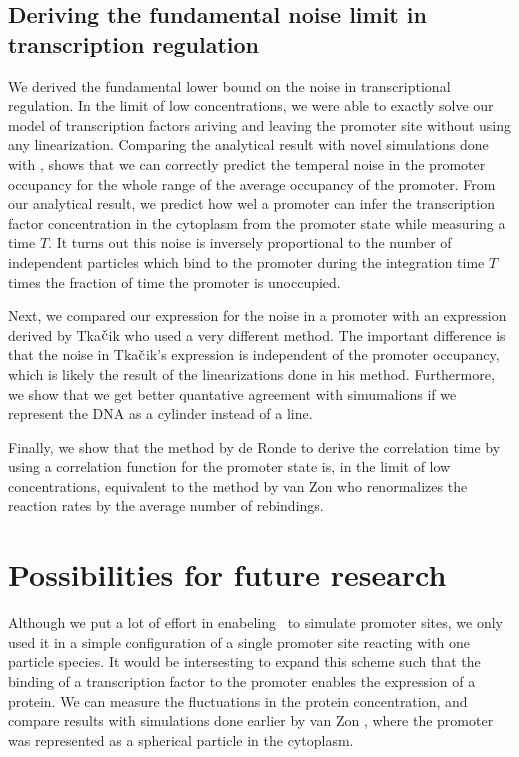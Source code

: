 \subsection{Deriving the fundamental noise limit in transcription regulation}
We derived the fundamental lower bound on the noise in transcriptional regulation. In the limit of low concentrations, we were able to exactly solve our model of transcription factors ariving and leaving the promoter site without using any linearization. Comparing the analytical result with novel simulations done with \GFRD, shows that we can correctly predict the temperal noise in the promoter occupancy for the whole range of the average occupancy of the promoter. From our analytical result, we predict how wel a promoter can infer the transcription factor concentration in the cytoplasm from the promoter state while measuring a time $T$. It turns out this noise is inversely proportional to the number of independent particles which bind to the promoter during the integration time $T$ times the fraction of time the promoter is unoccupied. 

Next, we compared our expression for the noise in a promoter with an expression derived by Tka$\check{\rm c}$ik who used a very different method. The important difference is that the noise in Tka$\check{\rm c}$ik's expression is independent of the promoter occupancy, which is likely the result of the linearizations done in his method. Furthermore, we show that we get better quantative agreement with simumalions if we represent the DNA as a cylinder instead of a line. 

Finally, we show that the method by de Ronde to derive the correlation time by using a correlation function for the promoter state is, in the limit of low concentrations, equivalent to the method by van Zon who renormalizes the reaction rates by the average number of rebindings.



\section{Possibilities for future research}
Although we put a lot of effort in enabeling \GFRD\, to simulate promoter sites, we only used it in a simple configuration of a single promoter site reacting with one particle species. It would be intersesting to expand this scheme such that the binding of a transcription factor to the promoter enables the expression of a protein. We can measure the fluctuations in the protein concentration, and compare results with simulations done earlier by van Zon \cite{VanZon2006}, where the promoter was represented as a spherical particle in the cytoplasm. 

